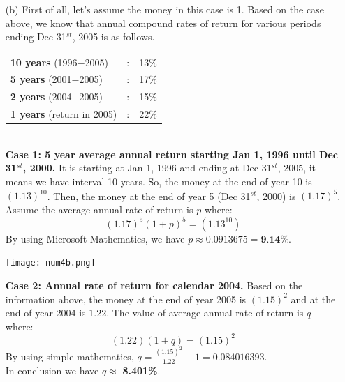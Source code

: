 \documentclass{article}
\begin{document}
\begin{enumerate}
\begin{enumerate}
			\vspace{0.3cm}
			\item[(b)] First of all, let's assume the money in this case is 1. Based on the case above, we know that annual compound rates of return for various periods ending Dec 31$^{st}$, 2005 is as follows.\vspace{0.1cm}\\
			\begin{tabular}{lcc}
				\textbf{10 years} (1996$-$2005)&:& 13\%\\
				\textbf{5 years} (2001$-$2005)&:& 17\%\\
				\textbf{2 years} (2004$-$2005)&:& 15\%\\
				\textbf{1 years} (return in 2005)&:& 22\%
			\end{tabular}
			\vspace{0.5cm}\\
			\textbf{Case 1: 5 year average annual return starting Jan 1, 1996 until Dec 31$^{st}$, 2000.} It is starting at Jan 1, 1996 and ending at Dec 31$^{st}$, 2005, it means we have interval 10 years. So, the money at the end of year 10 is $(1.13)^{10}$. Then, the money at the end of year 5 (Dec 31$^{st}$, 2000) is $(1.17)^{5}$. Assume the average annual rate of return is $p$ where: $$(1.17)^5(1+p)^5=(1.13^{10})$$ By using Microsoft Mathematics, we have $p\approx0.0913675=\textbf{9.14\%}$.\\
			\begin{center}
				\texttt{[image: num4b.png]}
			\end{center}
			\vspace{0.5cm}
			\textbf{Case 2: Annual rate of return for calendar 2004.} Based on the information above, the money at the end of year 2005 is $(1.15)^2$ and at the end of year 2004 is $1.22$. The value of average annual rate of return is $q$ where: $$(1.22)(1+q)=(1.15)^2$$ By using simple mathematics, $q=\frac{(1.15)^2}{1.22}-1=0.084016393$.\\ In conclusion we have $q\approx$ \textbf{8.401\%}.
		\end{enumerate}
	\end{enumerate}
\end{document}
